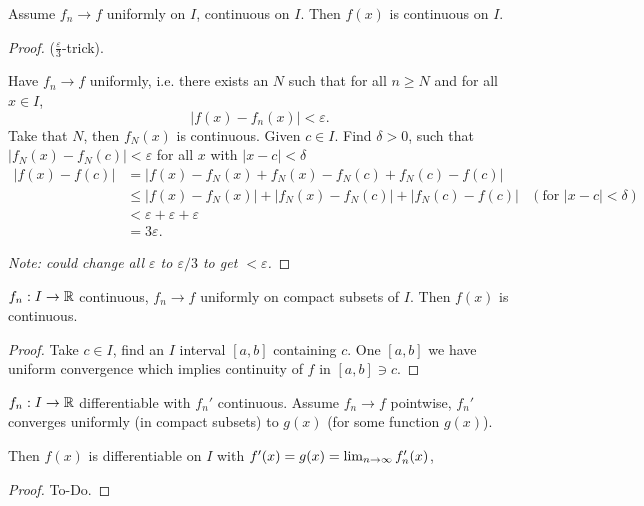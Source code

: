 \begin{theorem}\label{thm:uni_conv_imp_cont}
    Assume $f_n \to f$ uniformly on $I$,
    continuous on $I$.
    Then $f(x)$ is continuous on $I$.
\end{theorem}
\begin{proof}
    ($\frac{\varepsilon}{3}$-trick).

    Have $f_n \to f$ uniformly,
    i.e. there exists an $N$ such that for all $n \geq N$ and for all $x \in I$,
    \[
    |f(x) - f_n(x)| < \varepsilon.
    \]
    Take that $N$,
    then $f_N(x)$ is continuous.
    Given $c \in I$.
    Find $\delta > 0$,
    such that $|f_N(x) - f_N(c)| < \varepsilon$ for all $x$ with $|x - c| < \delta$
    \begin{align*}
        |f(x) - f(c)| &= |f(x) - f_N(x) + f_N(x) - f_N(c) + f_N(c) - f(c)| \\
        &\leq |f(x) - f_N(x)| + |f_N(x) - f_N(c)| + |f_N(c) - f(c)| &(\text{for $|x - c| < \delta$})\\
        &< \varepsilon + \varepsilon + \varepsilon \\
        &= 3\varepsilon.
    \end{align*}

    \textit{Note:
    could change all $\varepsilon$ to $\varepsilon / 3$ to get $<\varepsilon$.}
\end{proof}

\begin{theorem}\label{thm:uni_comp_imp_cont}
    $f_n : I \to \mathbb{R}$ continuous,
    $f_n \to f$ uniformly on compact subsets of $I$.
    Then $f(x)$ is continuous.
\end{theorem}
\begin{proof}
    Take $c \in I$,
    find an $I$ interval $[a, b]$ containing $c$.
    One $[a, b]$ we have uniform convergence which implies continuity of $f$ in $[a, b] \ni c$.
\end{proof}

\begin{theorem}\label{thm:diff_pointwise_then_diff}
    $f_n : I \to \mathbb{R}$ differentiable with $f_n'$ continuous.
    Assume $f_n \to f$ pointwise,
    $f_n'$ converges uniformly
    (in compact subsets)
    to $g(x)$
    (for some function $g(x)$).

    Then $f(x)$ is differentiable on $I$ with $f'(x) = g(x) = \lim_{n \rightarrow \infty} f_n'(x)$,
\end{theorem}
\begin{proof}
    To-Do.
\end{proof}

